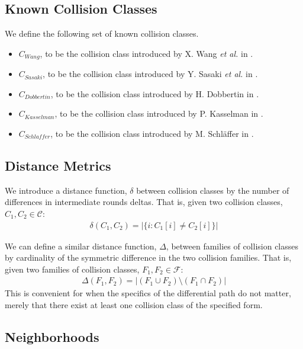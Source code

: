 \documentclass[conference]{IEEEtran}
\begin{document}
\subsection{Known Collision Classes}

We define the following set of known collision classes.

\begin{itemize}
    \item $C_{Wang}$, to be the collision class introduced by X. Wang
        \textit{et al.} in \cite{Wang2005}.
    \item $C_{Sasaki}$, to be the collision class introduced by Y. Sasaki
        \textit{et al.} in \cite{Sasaki2007}.
    \item $C_{Dobbertin}$, to be the collision class introduced by
        H. Dobbertin in \cite{Dobbertin1998}.
    \item $C_{Kasselman}$, to be the collision class introduced by
        P. Kasselman in \cite{KasselmanMD4}.
    \item $C_{Schlaffer}$, to be the collision class introduced by
        M. Schl{\"a}ffer in \cite{Schlaffer2006}.
\end{itemize}

\subsection{Distance Metrics}

We introduce a distance function, $\delta$ between collision classes by the
number of differences in intermediate rounds deltas. That is, given two
collision classes, $C_1, C_2 \in \mathcal{C}$:
\begin{align}
    \delta(C_1, C_2) = \big| \{ i : C_1[i] \neq C_2[i] \} \big|
\end{align}


We can define a similar distance function, $\Delta$, between families of
collision classes by cardinality of the symmetric difference in the two
collision families. That is, given two families of collision classes,
$F_1, F_2 \in \mathcal{F}$:
\begin{align}
    \Delta(F_1, F_2) = \big| (F_1 \cup F_2) \setminus (F_1 \cap F_2) \big|
\end{align}
This is convenient for when the specifics of the differential path do not
matter, merely that there exist at least one collision class of the specified
form.


\subsection{Neighborhoods}
\end{document}
